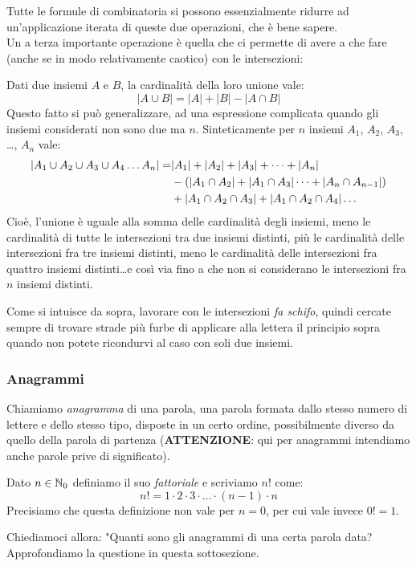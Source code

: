 \documentclass[11pt]{scrartcl}
\begin{document}
	Tutte le formule di combinatoria si possono essenzialmente ridurre ad un'applicazione iterata di queste due operazioni, che è bene sapere.\\
	Un a terza importante operazione è quella che ci permette di avere a che fare (anche se in modo relativamente caotico) con le intersezioni:
	\begin{lemma}
		Dati due insiemi $A$ e $B$, la cardinalità della loro unione vale:
		$$|A \cup B| = |A|+|B|-|A \cap B|$$
		Questo fatto si può generalizzare, ad una espressione complicata quando gli insiemi considerati non sono due ma $n$. Sinteticamente per $n$ insiemi $A_1$, $A_2$, $A_3$, \dots, $A_n$ vale: 
		\begin{equation}\notag
			\begin{split}
				|A_1 \cup A_2 \cup A_3 \cup A_4 \dots A_n| = &  |A_1|+|A_2|+|A_3|+\dots +|A_n|\\
				& -(|A_1 \cap A_2| + |A_1 \cap A_3| \dots +|A_n \cap A_{n-1}|)\\
				& +|A_1 \cap A_2 \cap A_3| + |A_1 \cap A_2 \cap A_4| \dots
			\end{split}
		\end{equation}
		Cioè, l'unione è uguale alla somma delle cardinalità degli insiemi, meno le cardinalità di tutte le intersezioni tra due insiemi distinti, più le cardinalità delle intersezioni fra tre insiemi distinti, meno le cardinalità delle intersezioni fra quattro insiemi distinti\dots e così via fino a che non si considerano le intersezioni fra $n$ insiemi distinti.
	\end{lemma}
	Come si intuisce da sopra, lavorare con le intersezioni \emph{fa schifo}, quindi cercate sempre di trovare strade più furbe di applicare alla lettera il principio sopra quando non potete ricondurvi al caso con soli due insiemi.
	\subsubsection{Anagrammi}
	\begin{definition}
		Chiamiamo \textit{anagramma} di una parola, una parola formata dallo stesso numero di lettere e dello stesso tipo, disposte in un certo ordine, possibilmente diverso da quello della parola di partenza (\textbf{ATTENZIONE}: qui per anagrammi intendiamo anche parole prive di significato).
	\end{definition}
	\begin{definition}
		\label{factorial}
		Dato $n\in\mathbb N_0$ definiamo il suo \textit{fattoriale} e scriviamo $n!$ come:
		$$n!=1\cdot2\cdot3\cdot\dots\cdot(n-1)\cdot n$$
		Precisiamo che questa definizione non vale per $n=0$, per cui vale invece $0!=1$.
	\end{definition}
	Chiediamoci allora: "Quanti sono gli anagrammi di una certa parola data?\\
	Approfondiamo la questione in questa sottosezione.
	
\end{document}
